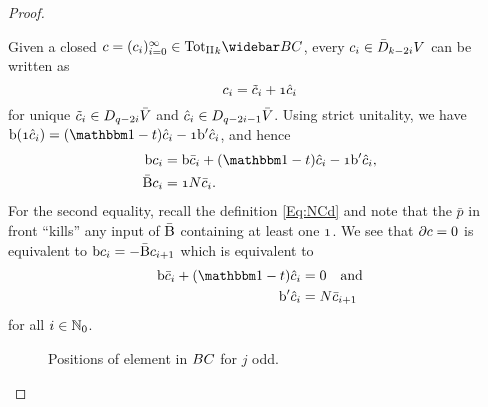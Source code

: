 \documentclass[\MainFolder/Text.tex]{subfiles}
\begin{document}
\begin{proof}
\begin{ProofList}
Given a closed $c = (c_i)_{i=0}^\infty \in \TotII_k \NConCycBi$, every $c_i \in \bar{D}_{k-2i} V$ can be written as 
\[ c_i = \tilde{c}_i + \NOne \hat{c}_i \]
for unique $\tilde{c}_i\in D_{q-2i} \bar{V}$ and $\hat{c}_i \in D_{q-2i-1} \bar{V}$. Using strict unitality, we have $\Hd(\NOne\hat{c}_i) = (\Id-\CycPermOp)\hat{c}_i - \NOne \Hd'\hat{c}_i$, and hence
\begin{align*}
   \Hd c_i &=  \Hd\bar{c}_i + (\Id-\CycPermOp)\hat{c}_i - \NOne \Hd'\hat{c}_i, \\
   \NCd c_i &= \NOne \CountOp \bar{c}_i.
\end{align*}
For the second equality, recall the definition \eqref{Eq:NCd} and note that the $\bar{p}$ in front ``kills'' any input of $\bar{\mathrm{B}}$ containing at least one $\NOne$. We see that $\partial c = 0$ is equivalent to $\mathrm{b} c_i = - \bar{\mathrm{B}} c_{i+1}$ which is equivalent to
\[ \begin{aligned}
\Hd \bar{c}_i + (\Id-\CycPermOp)\hat{c}_i & = 0\quad\text{and}  \\
\Hd'\hat{c}_i &= \CountOp \bar{c}_{i+1}
\end{aligned} \] 
for all $i\in \mathbb{N}_0$.
\begin{figure}
\centering
{}
\caption[Illustration of weight normalization in the Connes' bicomplex.]{Positions of element in $BC$ for $j$ odd.}
\label{Fig:PosOfElConCycBi}
\end{figure}


\end{ProofList}
\end{proof}
\end{document}
